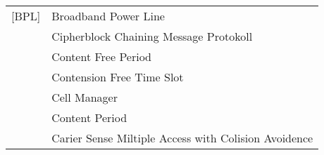 \begin{longtable}{lp{11cm}}
	 	[BPL]			& Broadband Power Line\\
	 	[CCMP]		& Cipherblock Chaining Message Protokoll\\
		[CFP]			& Content Free Period\\
		[CFTS]		& Contension Free Time Slot\\
		[CM]			& Cell Manager\\
		[CP]			& Content Period\\
		[CSMA/CA] 	& Carier Sense Miltiple Access with Colision Avoidence\\	
\end{longtable}
